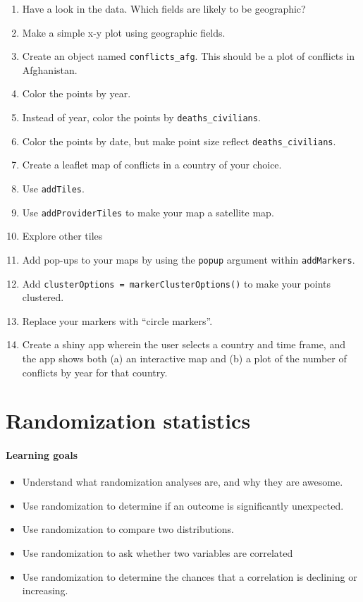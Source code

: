 \documentclass[
]{book}
\providecommand{\tightlist}{%
  \setlength{\itemsep}{0pt}\setlength{\parskip}{0pt}}
\begin{document}
\begin{enumerate}
\def\labelenumi{\arabic{enumi}.}
\setcounter{enumi}{2}
\item
  Have a look in the data. Which fields are likely to be geographic?
\item
  Make a simple x-y plot using geographic fields.
\item
  Create an object named \texttt{conflicts\_afg}. This should be a plot of conflicts in Afghanistan.
\item
  Color the points by year.
\item
  Instead of year, color the points by \texttt{deaths\_civilians}.
\item
  Color the points by date, but make point size reflect \texttt{deaths\_civilians}.
\item
  Create a leaflet map of conflicts in a country of your choice.
\item
  Use \texttt{addTiles}.
\item
  Use \texttt{addProviderTiles} to make your map a satellite map.
\item
  Explore other tiles
\item
  Add pop-ups to your maps by using the \texttt{popup} argument within \texttt{addMarkers}.
\item
  Add \texttt{clusterOptions\ =\ markerClusterOptions()} to make your points clustered.
\item
  Replace your markers with ``circle markers''.
\item
  Create a shiny app wherein the user selects a country and time frame, and the app shows both (a) an interactive map and (b) a plot of the number of conflicts by year for that country.
\end{enumerate}

\hypertarget{randomization-statistics}{%
\chapter{Randomization statistics}\label{randomization-statistics}}

\hypertarget{learning-goals-28}{%
\subsubsection*{Learning goals}\label{learning-goals-28}}

\begin{itemize}
\tightlist
\item
  Understand what randomization analyses are, and why they are awesome.
\item
  Use randomization to determine if an outcome is significantly unexpected.
\item
  Use randomization to compare two distributions.
\item
  Use randomization to ask whether two variables are correlated
\item
  Use randomization to determine the chances that a correlation is declining or increasing.
\end{itemize}
\end{document}
